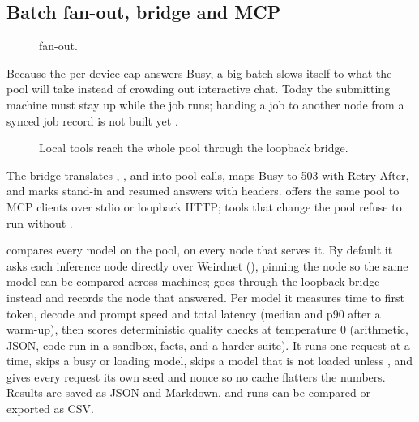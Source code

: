 \subsection{Batch fan-out, bridge and MCP}\label{sec:batch}

\begin{figure}[htbp]
\centering
{}
\caption{ fan-out.}
\end{figure}

Because the per-device cap answers Busy, a big batch slows itself to what the pool will take
instead of crowding out interactive chat. Today the submitting machine must stay up while the job
runs; handing a job to another node from a synced job record is not built yet \planned.

\begin{figure}[htbp]
\centering
{}
\caption{Local tools reach the whole pool through the loopback bridge.}
\end{figure}

The bridge translates , ,  and
 into pool calls, maps Busy to 503 with Retry-After, and marks stand-in and
resumed answers with  headers.  offers the same pool to MCP
clients over stdio or loopback HTTP; tools that change the pool refuse to run without
.

 compares every model on the pool, on every node that serves it. By default it
asks each inference node directly over Weirdnet (), pinning the node so the
same model can be compared across machines;  goes through the loopback bridge
instead and records the node that answered. Per model it measures time to first token, decode and
prompt speed and total latency (median and p90 after a warm-up), then scores deterministic quality
checks at temperature 0 (arithmetic, JSON, code run in a sandbox, facts, and a harder suite). It runs
one request at a time, skips a busy or loading model, skips a model that is not loaded unless
, and gives every request its own seed and nonce so no cache flatters the numbers.
Results are saved as JSON and Markdown, and runs can be compared or exported as CSV.
